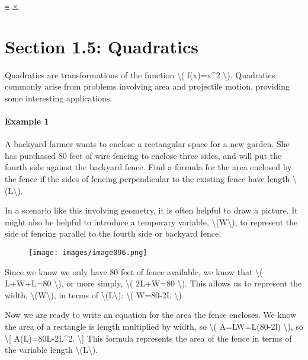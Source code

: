 \protect\hyperlink{main-nav}{≡} \protect\hyperlink{close-nav}{×}

\hypertarget{section-1.5-quadratics}{%
\section{Section 1.5: Quadratics}\label{section-1.5-quadratics}}

Quadratics are transformations of the function \textbackslash{}(
f(x)=x\^{}2 \textbackslash{}). Quadratics commonly arise from problems
involving area and projectile motion, providing some interesting
applications.

\hypertarget{example-1}{%
\paragraph{Example 1}\label{example-1}}

A backyard farmer wants to enclose a rectangular space for a new garden.
She has purchased 80 feet of wire fencing to enclose three sides, and
will put the fourth side against the backyard fence. Find a formula for
the area enclosed by the fence if the sides of fencing perpendicular to
the existing fence have length \textbackslash{}(L\textbackslash{}).

In a scenario like this involving geometry, it is often helpful to draw
a picture. It might also be helpful to introduce a temporary variable,
\textbackslash{}(W\textbackslash{}), to represent the side of fencing
parallel to the fourth side or backyard fence.

\begin{figure}
\centering
\texttt{[image: images/image096.png]}
\caption{}
\end{figure}

Since we know we only have 80 feet of fence available, we know that
\textbackslash{}( L+W+L=80 \textbackslash{}), or more simply,
\textbackslash{}( 2L+W=80 \textbackslash{}). This allows us to represent
the width, \textbackslash{}(W\textbackslash{}), in terms of
\textbackslash{}(L\textbackslash{}): \textbackslash{}( W=80-2L
\textbackslash{})

Now we are ready to write an equation for the area the fence encloses.
We know the area of a rectangle is length multiplied by width, so
\textbackslash{}( A=LW=L(80-2l) \textbackslash{}), so
\textbackslash{}{[} A(L)=80L-2L\^{}2. \textbackslash{}{]} This formula
represents the area of the fence in terms of the variable length
\textbackslash{}(L\textbackslash{}).

